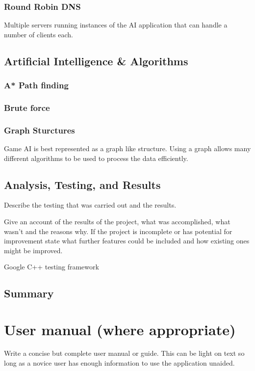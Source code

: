 \documentclass[12pt,a4paper,titlepage]{article}
\begin{document}
\subsubsection{Round Robin DNS}

Multiple servers running instances of the AI application that can handle a number of clients each. 

\subsection{Artificial Intelligence \& Algorithms}

\subsubsection{A* Path finding}

\subsubsection{Brute force}

\subsubsection{Graph Sturctures}

Game AI is best represented as a graph like structure. Using a graph allows many different algorithms to be used to process the data efficiently.

\subsection{Analysis, Testing, and Results}

Describe the testing that was carried out and the results.

Give an account of the results of the project, what was accomplished, what wasn't and the reasons why. If the project is incomplete or has potential for improvement state what further features could be included and how existing ones might be improved.

Google C++ testing framework

\subsection{Summary}


\section{User manual (where appropriate)}
Write a concise but complete user manual or guide. This can be light on text so long as a novice user has enough information to use the application unaided.
\end{document}
